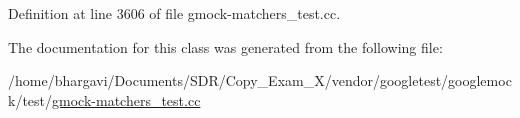 Definition at line 3606 of file gmock-\/matchers\+\_\+test.\+cc.



The documentation for this class was generated from the following file\+:\begin{DoxyCompactItemize}
\item 
/home/bhargavi/\+Documents/\+S\+D\+R/\+Copy\+\_\+\+Exam\+\_\+X/vendor/googletest/googlemock/test/\hyperlink{gmock-matchers__test_8cc}{gmock-\/matchers\+\_\+test.\+cc}\end{DoxyCompactItemize}
